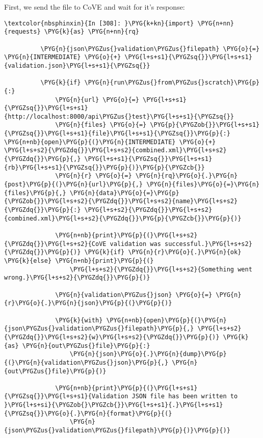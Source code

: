 \documentclass[letterpaper,10pt,english]{sphinxmanual}
\begin{document}
First, we send the file to CoVE and wait for it's response:

\begin{Verbatim}[commandchars=\\\{\}]
\textcolor{nbsphinxin}{In [308]: }\PYG{k+kn}{import} \PYG{n+nn}{requests} \PYG{k}{as} \PYG{n+nn}{rq}
          
          \PYG{n}{json\PYGZus{}validation\PYGZus{}filepath} \PYG{o}{=} \PYG{n}{INTERMEDIATE} \PYG{o}{+} \PYG{l+s+s1}{\PYGZsq{}}\PYG{l+s+s1}{validation.json}\PYG{l+s+s1}{\PYGZsq{}}
          
          \PYG{k}{if} \PYG{n}{run\PYGZus{}from\PYGZus{}scratch}\PYG{p}{:}
              \PYG{n}{url} \PYG{o}{=} \PYG{l+s+s1}{\PYGZsq{}}\PYG{l+s+s1}{http://localhost:8000/api\PYGZus{}test}\PYG{l+s+s1}{\PYGZsq{}}
              \PYG{n}{files} \PYG{o}{=} \PYG{p}{\PYGZob{}}\PYG{l+s+s1}{\PYGZsq{}}\PYG{l+s+s1}{file}\PYG{l+s+s1}{\PYGZsq{}}\PYG{p}{:} \PYG{n+nb}{open}\PYG{p}{(}\PYG{n}{INTERMEDIATE} \PYG{o}{+} \PYG{l+s+s2}{\PYGZdq{}}\PYG{l+s+s2}{combined.xml}\PYG{l+s+s2}{\PYGZdq{}}\PYG{p}{,} \PYG{l+s+s1}{\PYGZsq{}}\PYG{l+s+s1}{rb}\PYG{l+s+s1}{\PYGZsq{}}\PYG{p}{)}\PYG{p}{\PYGZcb{}}
              \PYG{n}{r} \PYG{o}{=} \PYG{n}{rq}\PYG{o}{.}\PYG{n}{post}\PYG{p}{(}\PYG{n}{url}\PYG{p}{,} \PYG{n}{files}\PYG{o}{=}\PYG{n}{files}\PYG{p}{,} \PYG{n}{data}\PYG{o}{=}\PYG{p}{\PYGZob{}}\PYG{l+s+s2}{\PYGZdq{}}\PYG{l+s+s2}{name}\PYG{l+s+s2}{\PYGZdq{}}\PYG{p}{:} \PYG{l+s+s2}{\PYGZdq{}}\PYG{l+s+s2}{combined.xml}\PYG{l+s+s2}{\PYGZdq{}}\PYG{p}{\PYGZcb{}}\PYG{p}{)}
          
              \PYG{n+nb}{print}\PYG{p}{(}\PYG{l+s+s2}{\PYGZdq{}}\PYG{l+s+s2}{CoVE validation was successful.}\PYG{l+s+s2}{\PYGZdq{}}\PYG{p}{)} \PYG{k}{if} \PYG{n}{r}\PYG{o}{.}\PYG{n}{ok} \PYG{k}{else} \PYG{n+nb}{print}\PYG{p}{(}
                  \PYG{l+s+s2}{\PYGZdq{}}\PYG{l+s+s2}{Something went wrong.}\PYG{l+s+s2}{\PYGZdq{}}\PYG{p}{)}
          
              \PYG{n}{validation\PYGZus{}json} \PYG{o}{=} \PYG{n}{r}\PYG{o}{.}\PYG{n}{json}\PYG{p}{(}\PYG{p}{)}
          
              \PYG{k}{with} \PYG{n+nb}{open}\PYG{p}{(}\PYG{n}{json\PYGZus{}validation\PYGZus{}filepath}\PYG{p}{,} \PYG{l+s+s2}{\PYGZdq{}}\PYG{l+s+s2}{w}\PYG{l+s+s2}{\PYGZdq{}}\PYG{p}{)} \PYG{k}{as} \PYG{n}{out\PYGZus{}file}\PYG{p}{:}
                  \PYG{n}{json}\PYG{o}{.}\PYG{n}{dump}\PYG{p}{(}\PYG{n}{validation\PYGZus{}json}\PYG{p}{,} \PYG{n}{out\PYGZus{}file}\PYG{p}{)}
          
              \PYG{n+nb}{print}\PYG{p}{(}\PYG{l+s+s1}{\PYGZsq{}}\PYG{l+s+s1}{Validation JSON file has been written to }\PYG{l+s+si}{\PYGZob{}\PYGZcb{}}\PYG{l+s+s1}{.}\PYG{l+s+s1}{\PYGZsq{}}\PYG{o}{.}\PYG{n}{format}\PYG{p}{(}
                  \PYG{n}{json\PYGZus{}validation\PYGZus{}filepath}\PYG{p}{)}\PYG{p}{)}
          

\end{Verbatim}
\end{document}
